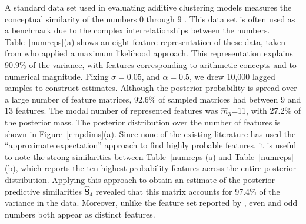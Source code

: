 \documentclass[11pt]{article}
\begin{document}
A standard data set used in evaluating additive clustering models measures the conceptual similarity of the numbers 0 through 9 \cite{shepardkc75}. This data set is often used as a benchmark due to the complex interrelationships between the numbers. Table~\ref{numreps}(a) shows an eight-feature representation of these data, taken from  who applied a maximum likelihood approach. This representation explains 90.9\% of the variance, with features corresponding to arithmetic concepts and to numerical magnitude. Fixing $\sigma=0.05$, and $\alpha=0.5$, we drew 10,000 lagged samples to construct estimates. Although the posterior probability is spread over a large number of feature matrices, 92.6\% of sampled matrices had between 9 and 13 features. The modal number of represented features was $\hat{m}_3$=11, with 27.2\% of the posterior mass. The posterior distribution over the number of features is shown in Figure~\ref{empdims}(a). Since none of the existing literature has used the ``approximate expectation'' approach to find highly probable features, it is useful to note the strong similarities between Table~\ref{numreps}(a) and Table~\ref{numreps}(b), which reports the ten highest-probability features across the entire posterior distribution. Applying this approach to obtain an estimate of the posterior predictive similarities $\hat{\mathbf{S}}_4$ revealed that this matrix accounts for 97.4\% of the variance in the data. Moreover, unlike the feature set reported by , even and odd numbers both appear as distinct features.
\end{document}
